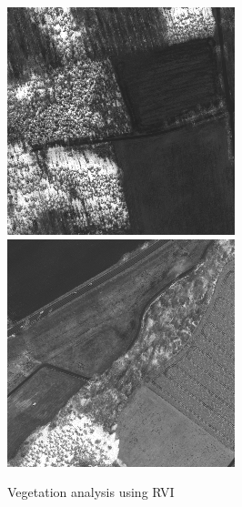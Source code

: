 \begin{figure}
    \includegraphics[width=\VegetationIndicesImageWidth]{images/vegetation/rvi/4} \hfill
    \includegraphics[width=\VegetationIndicesImageWidth]{images/vegetation/rvi/5}

    \caption{Vegetation analysis using RVI}
    \label{fig:vegetation_rvi_examples}
\end{figure}

